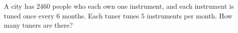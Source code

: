A city has $2460$ people who each own one instrument, and each instrument is tuned once every $6$ months. Each tuner tunes $5$ instruments per month. How many tuners are there?
